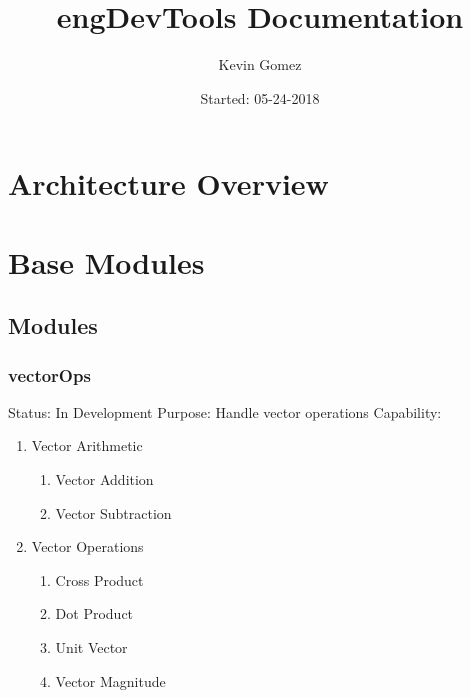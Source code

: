 \documentclass{article}
\title{engDevTools Documentation}
\date{Started: 05-24-2018}
\author{Kevin Gomez}
\begin{document}
	
	\maketitle
	\newpage
	
	\section{Architecture Overview}
	
	\section{Base Modules}
		\subsection{Modules}
			\subsubsection{vectorOps}
				Status: In Development \newline
				Purpose: Handle vector operations \newline
				Capability:
				\begin{enumerate}
					\item Vector Arithmetic
					\begin{enumerate}
						\item Vector Addition
						\item Vector Subtraction
					\end{enumerate}
					\item Vector Operations
					\begin{enumerate}
						\item Cross Product
						\item Dot Product
						\item Unit Vector
						\item Vector Magnitude
					\end{enumerate}
				\end{enumerate}
				
\end{document}
